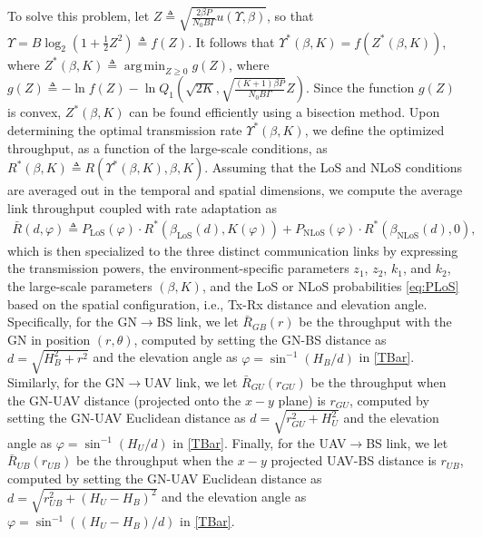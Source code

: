 \documentclass[12pt, draftcls, onecolumn]{IEEEtran}
\theoremstyle{plain}
\theoremstyle{definition}
\theoremstyle{remark}
\DeclareMathOperator*{\argmin}{arg\,min}
\begin{document}
To solve this problem, let $Z{\triangleq}\sqrt{\frac{2{\beta}P}{N_{0}B\Gamma}u(\Upsilon,\beta)}$, so that $\Upsilon{=}B\log_{2}\left(1{+}\frac{1}{2}Z^{2}\right){\triangleq}f(Z)$. It follows that $\Upsilon^{*}(\beta,K){=}f(Z^{*}(\beta,K))$, where $Z^{*}(\beta,K)\triangleq\argmin_{Z{\geq}0}g(Z)$, where $g(Z) \triangleq -\ln f(Z) - \ln Q_{1}\left(\sqrt{2K},\sqrt{\frac{(K{+}1)\beta P}{N_{0}B\Gamma}}Z\right)$. Since the function $g(Z)$ is convex, $Z^{*}(\beta,K)$ can be found efficiently using a bisection method. Upon determining the optimal transmission rate $\Upsilon^{*}(\beta,K)$, we define the optimized throughput, as a function of the large-scale conditions, as $R^{*}(\beta,K) \triangleq R(\Upsilon^{*}(\beta,K),\beta,K)$. Assuming that the LoS and NLoS conditions are averaged out in the temporal and spatial dimensions, we compute the average link throughput coupled with rate adaptation as
\begin{align}\label{TBar}
	\bar{R}(d,\varphi)\triangleq P_{\mathrm{LoS}}(\varphi)\cdot R^{*}(\beta_{\mathrm{LoS}}(d),K(\varphi))+P_{\mathrm{NLoS}}(\varphi)\cdot R^{*}(\beta_{\mathrm{NLoS}}(d),0),
\end{align}
which is then specialized to the three distinct communication links by expressing the transmission powers, the environment-specific parameters $z_{1}$, $z_{2}$, $k_{1}$, and $k_{2}$, the large-scale parameters $(\beta,K)$, and the LoS or NLoS probabilities \eqref{eq:PLoS} based on the spatial configuration, i.e., Tx-Rx distance and elevation angle. Specifically, for the GN$\rightarrow$BS link, we let $\bar{R}_{GB}(r)$ be the throughput with the GN in position $(r,\theta)$, computed by setting the GN-BS distance as $d{=}\sqrt{H_{B}^{2}{+}r^{2}}$ and the elevation angle as $\varphi{=}\sin^{-1}\left(H_{B}/d\right)$ in \eqref{TBar}. Similarly, for the GN$\rightarrow$UAV link, we let $\bar{R}_{GU}(r_{GU})$ be the throughput when the GN-UAV distance (projected onto the $x{-}y$ plane) is $r_{GU}$, computed by setting the GN-UAV Euclidean distance as $d{=}\sqrt{r_{GU}^{2}{+}H_{U}^{2}}$ and the elevation angle as $\varphi{=}\sin^{-1}\left(H_{U}/d\right)$ in \eqref{TBar}. Finally, for the UAV$\rightarrow$BS link, we let $\bar{R}_{UB}(r_{UB})$ be the throughput when the $x{-}y$ projected UAV-BS distance is $r_{UB}$, computed by setting the GN-UAV Euclidean distance as $d{=}\sqrt{r_{UB}^{2}{+}(H_{U}{-}H_{B})^{2}}$ and the elevation angle as $\varphi{=}\sin^{-1}\left((H_{U}{-}H_{B})/d\right)$ in \eqref{TBar}.
\end{document}
